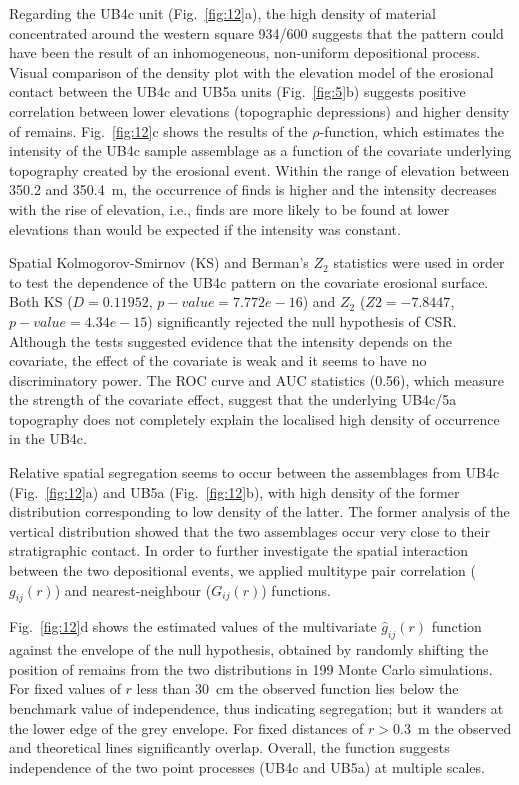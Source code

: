 \documentclass[preprint,authoryear,times]{elsarticle} %
\begin{document}
Regarding the UB4c unit (Fig.~\ref{fig:12}a), the high density of material concentrated around the western square 934/600 suggests that the pattern could have been the result of an inhomogeneous, non-uniform depositional process. Visual comparison of the density plot with the elevation model of the erosional contact between the UB4c and UB5a units (Fig.~\ref{fig:5}b) suggests positive correlation between lower elevations (topographic depressions) and higher density of remains. Fig.~\ref{fig:12}c shows the results of the $\rho$-function, which estimates the intensity of the UB4c sample assemblage as a function of the covariate underlying topography created by the erosional event. Within the range of elevation between 350.2 and 350.4~m, the occurrence of finds is higher and the intensity decreases with the rise of elevation, i.e., finds are more likely to be found at lower elevations than would be expected if the intensity was constant.

Spatial Kolmogorov-Smirnov (KS) and Berman's $Z_2$ \citep{Berman1986} statistics were used in order to test the dependence of the UB4c pattern on the covariate erosional surface. Both KS ($D=0.11952$, $p-value=7.772e-16$) and $Z_2$ ($Z2=-7.8447$, $p-value=4.34e-15$) significantly rejected the null hypothesis of CSR. Although the tests suggested evidence that the intensity depends on the covariate, the effect of the covariate is weak and it seems to have no discriminatory power. The ROC curve and AUC statistics (0.56), which measure the strength of the covariate effect, suggest that the underlying UB4c/5a topography does not completely explain the localised high density of occurrence in the UB4c.

Relative spatial segregation seems to occur between the assemblages from UB4c (Fig.~\ref{fig:12}a) and UB5a (Fig.~\ref{fig:12}b), with high density of the former distribution corresponding to low density of the latter. The former analysis of the vertical distribution showed that the two assemblages occur very close to their stratigraphic contact. In order to further investigate the spatial interaction between the two depositional events, we applied multitype pair correlation ($g_{ij}(r)$) and nearest-neighbour ($G_{ij}(r)$) functions.

Fig.~\ref{fig:12}d shows the estimated values of the multivariate $\hat{g}_{ij}(r)$ function against the envelope of the null hypothesis, obtained by randomly shifting the position of remains from the two distributions in 199 Monte Carlo simulations. For fixed values of $r$ less than 30~cm the observed function lies below the benchmark value of independence, thus indicating segregation; but it wanders at the lower edge of the grey envelope. For fixed distances of $r>0.3$~m the observed and theoretical lines significantly overlap. Overall, the function suggests independence of the two point processes (UB4c and UB5a) at multiple scales.
\end{document}
